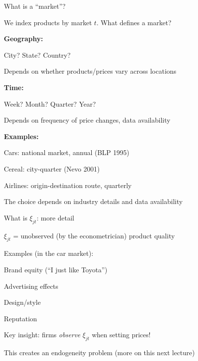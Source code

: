 \documentclass[notes,11pt, aspectratio=169]{beamer}
\newenvironment{wideitemize}{\itemize\addtolength{\itemsep}{10pt}}{\enditemize}
\begin{document}
\begin{frame}{What is a ``market''?}
	\begin{wideitemize}
		\item We index products by market $t$. What defines a market?
		\item \textbf{Geography:}
		\begin{wideitemize}
			\vspace{5pt}
			\item City? State? Country?
			\item Depends on whether products/prices vary across locations
		\end{wideitemize}
		\item \textbf{Time:}
		\begin{wideitemize}
			\vspace{5pt}
			\item Week? Month? Quarter? Year?
			\item Depends on frequency of price changes, data availability
		\end{wideitemize}
		\item \textbf{Examples:}
		\begin{wideitemize}
			\vspace{5pt}
			\item Cars: national market, annual (BLP 1995)
			\item Cereal: city-quarter (Nevo 2001)
			\item Airlines: origin-destination route, quarterly
		\end{wideitemize}
		\item The choice depends on industry details and data availability
	\end{wideitemize}
\end{frame}

\begin{frame}{What is $\xi_{jt}$: more detail}
	\begin{wideitemize}
		\item $\xi_{jt}$ = unobserved (by the econometrician) product quality
		\item Examples (in the car market): \pause
		\begin{wideitemize}
			\vspace{5pt}
			\item Brand equity (``I just like Toyota'')
			\item Advertising effects
			\item Design/style
			\item Reputation
		\end{wideitemize}
		\item Key insight: firms \textit{observe} $\xi_{jt}$ when setting prices!
		\item This creates an endogeneity problem (more on this next lecture)
	\end{wideitemize}
\end{frame}
\end{document}
